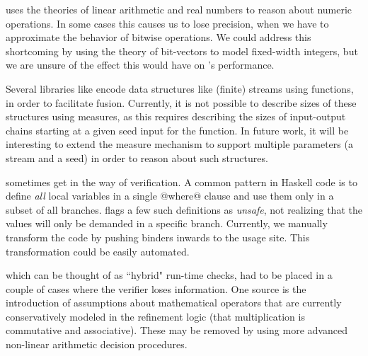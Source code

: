 \toolname uses the theories of linear arithmetic and
real numbers to reason about numeric operations. In some
cases this causes us to lose precision, \eg when we have to
approximate the behavior of bitwise operations. We could
address this shortcoming by using the theory of bit-vectors
to model fixed-width integers, but we are unsure of the
effect this would have on \toolname's performance.

\begin{comment}
\mypara{Higher-order functions} 
must sometimes be \emph{specialized} because the 
original type is not precise enough. 
%
For example, the \texttt{concat} function that
concatenates a list of input @ByteString@s %
pre-allocates the output region by computing the 
total size of the input.
%
\begin{code}
  len = sum . map length $ xs
\end{code}
Unfortunately, the type for @map@ is not sufficiently
precise to conclude that the value @len@ equals 
@bLens xs@, se we must manually specialize
the above into a single recursive traversal that 
computes the lengths.
%
Rather than complicating the type system with a very
general higher-order type for @map@ we suspect the 
best way forward will be to allow the user to specify
inlining in a clean fashion.
\end{comment}

 Several libraries like \lbtext
encode data structures like (finite) streams using functions,
in order to facilitate fusion. Currently, it is not possible
to describe sizes of these structures using measures, as this
requires describing the sizes of input-output chains starting
at a given seed input for the function. In future work, it will 
be interesting to extend the measure mechanism to support 
multiple parameters (\eg a stream and a seed) in order to reason
about such structures. 

 sometimes get in the way of verification. 
A common pattern in Haskell code is to define \emph{all} 
local variables in a single @where@ clause and use them 
only in a subset of all branches. 
%
\toolname flags a few such definitions as \emph{unsafe},
not realizing that the values will only be demanded in a
specific branch. 
%
Currently, we manually transform the code by pushing 
binders inwards to the usage site. %
This transformation could be easily automated.

which can be thought of as ``hybrid" run-time checks,
had to be placed in a couple of cases where the verifier 
loses information. 
%
One source is the introduction of assumptions about
mathematical operators that are currently conservatively 
modeled in the refinement logic (\eg that multiplication 
is commutative and associative). 
These may be removed by using more advanced non-linear 
arithmetic decision procedures.

